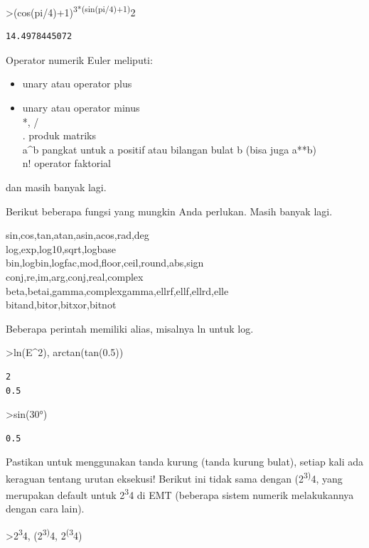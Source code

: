 \documentclass[
]{book}
\providecommand{\tightlist}{%
  \setlength{\itemsep}{0pt}\setlength{\parskip}{0pt}}
\begin{document}
\textgreater(cos(pi/4)+1)\textsuperscript{3*(sin(pi/4)+1)}2

\begin{verbatim}
14.4978445072
\end{verbatim}

Operator numerik Euler meliputi:

\begin{itemize}
\tightlist
\item
  unary atau operator plus\\
\item
  unary atau operator minus\\
  *, /\\
  . produk matriks\\
  a\^{}b pangkat untuk a positif atau bilangan bulat b (bisa juga a**b)\\
  n! operator faktorial
\end{itemize}

dan masih banyak lagi.

Berikut beberapa fungsi yang mungkin Anda perlukan. Masih banyak lagi.

sin,cos,tan,atan,asin,acos,rad,deg\\
log,exp,log10,sqrt,logbase\\
bin,logbin,logfac,mod,floor,ceil,round,abs,sign\\
conj,re,im,arg,conj,real,complex\\
beta,betai,gamma,complexgamma,ellrf,ellf,ellrd,elle\\
bitand,bitor,bitxor,bitnot

Beberapa perintah memiliki alias, misalnya ln untuk log.

\textgreater ln(E\^{}2), arctan(tan(0.5))

\begin{verbatim}
2
0.5
\end{verbatim}

\textgreater sin(30°)

\begin{verbatim}
0.5
\end{verbatim}

Pastikan untuk menggunakan tanda kurung (tanda kurung bulat), setiap kali ada keraguan tentang urutan eksekusi! Berikut ini tidak sama dengan (2\textsuperscript{3)}4, yang merupakan default untuk 2\textsuperscript{3}4 di EMT (beberapa sistem numerik melakukannya dengan cara lain).

\textgreater2\textsuperscript{3}4, (2\textsuperscript{3)}4, 2\textsuperscript{(3}4)
\end{document}
